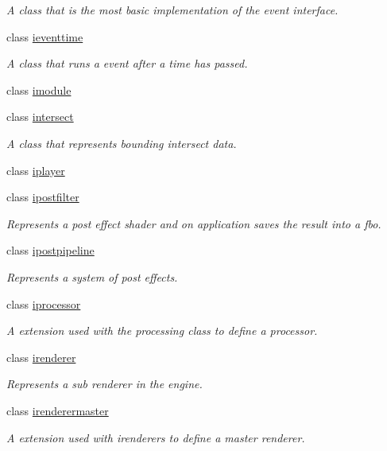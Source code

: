\begin{DoxyCompactItemize}
\begin{DoxyCompactList}\small\item\em A class that is the most basic implementation of the event interface. \end{DoxyCompactList}\item 
class \hyperlink{classflounder_1_1ieventtime}{ieventtime}
\begin{DoxyCompactList}\small\item\em A class that runs a event after a time has passed. \end{DoxyCompactList}\item 
class \hyperlink{classflounder_1_1imodule}{imodule}
\item 
class \hyperlink{classflounder_1_1intersect}{intersect}
\begin{DoxyCompactList}\small\item\em A class that represents bounding intersect data. \end{DoxyCompactList}\item 
class \hyperlink{classflounder_1_1iplayer}{iplayer}
\item 
class \hyperlink{classflounder_1_1ipostfilter}{ipostfilter}
\begin{DoxyCompactList}\small\item\em Represents a post effect shader and on application saves the result into a fbo. \end{DoxyCompactList}\item 
class \hyperlink{classflounder_1_1ipostpipeline}{ipostpipeline}
\begin{DoxyCompactList}\small\item\em Represents a system of post effects. \end{DoxyCompactList}\item 
class \hyperlink{classflounder_1_1iprocessor}{iprocessor}
\begin{DoxyCompactList}\small\item\em A extension used with the processing class to define a processor. \end{DoxyCompactList}\item 
class \hyperlink{classflounder_1_1irenderer}{irenderer}
\begin{DoxyCompactList}\small\item\em Represents a sub renderer in the engine. \end{DoxyCompactList}\item 
class \hyperlink{classflounder_1_1irenderermaster}{irenderermaster}
\begin{DoxyCompactList}\small\item\em A extension used with irenderers to define a master renderer. \end{DoxyCompactList}\item 

\end{DoxyCompactItemize}
